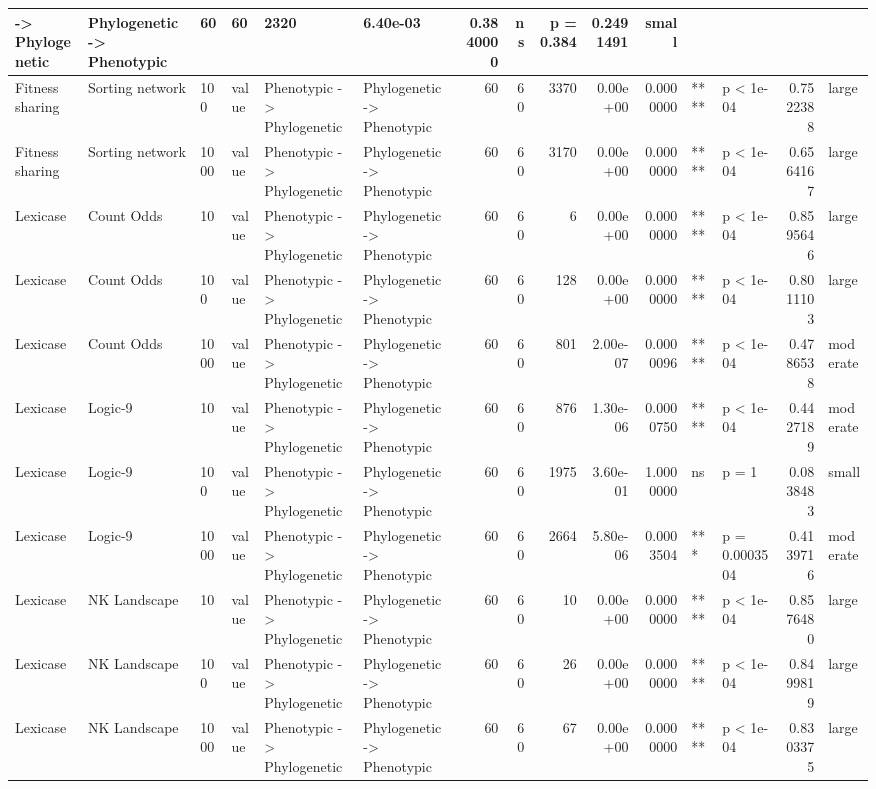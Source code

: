 \documentclass[]{book}
\begin{document}
\begin{table}
\begin{tabular}[t]{l|l|l|l|l|l|r|r|r|r|r|l|l|r|l}
    ->
Phylogenetic & Phylogenetic
    ->
Phenotypic & 60 & 60 & 2320 & 6.40e-03 & 0.3840000 & ns & p = 0.384 & 0.2491491 & small\\
\hline
Fitness sharing & Sorting network & 100 & value & Phenotypic
    ->
Phylogenetic & Phylogenetic
    ->
Phenotypic & 60 & 60 & 3370 & 0.00e+00 & 0.0000000 & **** & p < 1e-04 & 0.7522388 & large\\
\hline
Fitness sharing & Sorting network & 1000 & value & Phenotypic
    ->
Phylogenetic & Phylogenetic
    ->
Phenotypic & 60 & 60 & 3170 & 0.00e+00 & 0.0000000 & **** & p < 1e-04 & 0.6564167 & large\\
\hline
Lexicase & Count Odds & 10 & value & Phenotypic
    ->
Phylogenetic & Phylogenetic
    ->
Phenotypic & 60 & 60 & 6 & 0.00e+00 & 0.0000000 & **** & p < 1e-04 & 0.8595646 & large\\
\hline
Lexicase & Count Odds & 100 & value & Phenotypic
    ->
Phylogenetic & Phylogenetic
    ->
Phenotypic & 60 & 60 & 128 & 0.00e+00 & 0.0000000 & **** & p < 1e-04 & 0.8011103 & large\\
\hline
Lexicase & Count Odds & 1000 & value & Phenotypic
    ->
Phylogenetic & Phylogenetic
    ->
Phenotypic & 60 & 60 & 801 & 2.00e-07 & 0.0000096 & **** & p < 1e-04 & 0.4786538 & moderate\\
\hline
Lexicase & Logic-9 & 10 & value & Phenotypic
    ->
Phylogenetic & Phylogenetic
    ->
Phenotypic & 60 & 60 & 876 & 1.30e-06 & 0.0000750 & **** & p < 1e-04 & 0.4427189 & moderate\\
\hline
Lexicase & Logic-9 & 100 & value & Phenotypic
    ->
Phylogenetic & Phylogenetic
    ->
Phenotypic & 60 & 60 & 1975 & 3.60e-01 & 1.0000000 & ns & p = 1 & 0.0838483 & small\\
\hline
Lexicase & Logic-9 & 1000 & value & Phenotypic
    ->
Phylogenetic & Phylogenetic
    ->
Phenotypic & 60 & 60 & 2664 & 5.80e-06 & 0.0003504 & *** & p = 0.0003504 & 0.4139716 & moderate\\
\hline
Lexicase & NK Landscape & 10 & value & Phenotypic
    ->
Phylogenetic & Phylogenetic
    ->
Phenotypic & 60 & 60 & 10 & 0.00e+00 & 0.0000000 & **** & p < 1e-04 & 0.8576480 & large\\
\hline
Lexicase & NK Landscape & 100 & value & Phenotypic
    ->
Phylogenetic & Phylogenetic
    ->
Phenotypic & 60 & 60 & 26 & 0.00e+00 & 0.0000000 & **** & p < 1e-04 & 0.8499819 & large\\
\hline
Lexicase & NK Landscape & 1000 & value & Phenotypic
    ->
Phylogenetic & Phylogenetic
    ->
Phenotypic & 60 & 60 & 67 & 0.00e+00 & 0.0000000 & **** & p < 1e-04 & 0.8303375 & large\\

\end{tabular}
\end{table}
\end{document}
